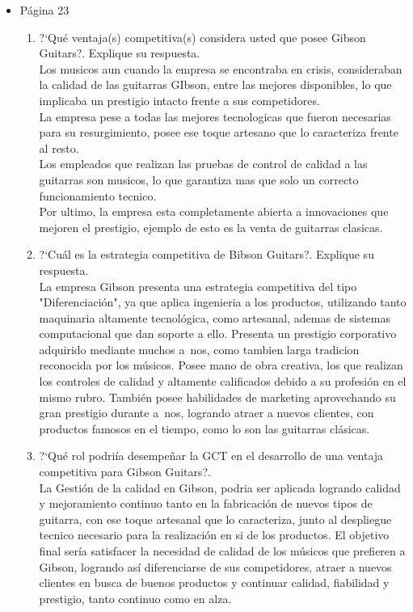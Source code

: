 \begin{itemize}
	\item P\'agina 23
	\begin{enumerate}
		\item ?`Qu\'e ventaja(s) competitiva(s) considera usted que posee Gibson Guitars?. Explique su respuesta.\\
		Los musicos aun cuando la empresa se encontraba en crisis, consideraban
 la calidad de las guitarras GIbson, entre las mejores disponibles, lo que implicaba un
 prestigio intacto frente a sus competidores.\\

		La empresa pese a todas las mejores tecnologicas que fueron necesarias
 para su resurgimiento, posee ese toque artesano que lo caracteriza frente al resto.\\

		Los empleados que realizan las pruebas de control de calidad a las guitarras
 son musicos, lo que garantiza mas que solo un correcto funcionamiento tecnico.\\

		Por ultimo, la empresa esta completamente abierta a innovaciones que mejoren 
el prestigio, ejemplo de esto es la venta de guitarras clasicas.\\

		\item ?`Cu\'al es la estrategia competitiva de Bibson Guitars?. Explique su respuesta.\\
		La empresa Gibson presenta una estrategia competitiva del tipo "Diferenciaci\'on", ya 
que aplica ingenieria a los productos, utilizando tanto maquinaria altamente tecnol\'ogica, como artesanal,
 ademas de sistemas computacional que dan soporte a ello. Presenta un prestigio corporativo adquirido 
mediante muchos a~nos, como tambien larga tradicion reconocida por los m\'usicos. Posee mano de obra
 creativa, los que realizan los controles de calidad y altamente calificados debido a su profesi\'on
 en el mismo rubro. Tambi\'en posee habilidades de marketing aprovechando su gran prestigio durante
 a~nos, logrando atraer a nuevos clientes, con productos famosos en el tiempo, como lo son las 
guitarras cl\'asicas.\\

		\item ?`Qu\'e rol podri\'ia desempe\~nar la GCT en el desarrollo de una ventaja competitiva para Gibson Guitars?.\\
		La  Gesti\'on de la calidad en Gibson, podria ser aplicada logrando calidad y mejoramiento
 continuo tanto en la fabricaci\'on de nuevos tipos de guitarra, con ese toque artesanal que lo caracteriza, 
junto al despliegue tecnico necesario para la realizaci\'on en si de los productos. El objetivo final ser\'ia
 satisfacer la necesidad de calidad de los m\'usicos que prefieren a Gibson, logrando as\'i diferenciarse de
 sus competidores, atraer a nuevos clientes en busca de buenos productos y continuar calidad, fiabilidad
 y prestigio, tanto continuo como en alza.\\


\end{enumerate}
\end{itemize}
